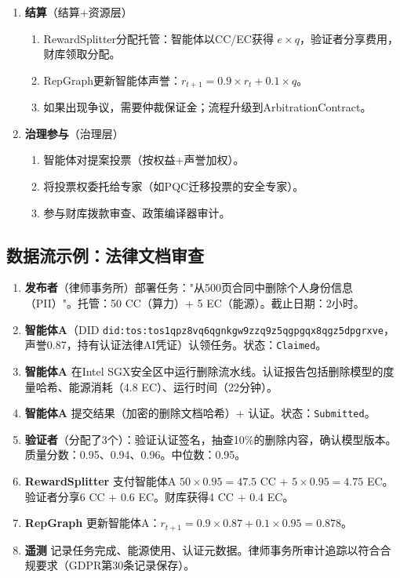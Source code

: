 \documentclass[11pt]{article}
\begin{document}
\begin{enumerate}
\begin{enumerate}[label=\alph*.]
    \end{enumerate}
  \item \textbf{结算}（结算+资源层）
    \begin{enumerate}[label=\alph*.]
      \item RewardSplitter分配托管：智能体以CC/EC获得 $e \times q$，验证者分享费用，财库领取分配。
      \item RepGraph更新智能体声誉：$r_{t+1} = 0.9 \times r_t + 0.1 \times q$。
      \item 如果出现争议，需要仲裁保证金；流程升级到ArbitrationContract。
    \end{enumerate}
  \item \textbf{治理参与}（治理层）
    \begin{enumerate}[label=\alph*.]
      \item 智能体对提案投票（按权益+声誉加权）。
      \item 将投票权委托给专家（如PQC迁移投票的安全专家）。
      \item 参与财库拨款审查、政策编译器审计。
    \end{enumerate}
\end{enumerate}

\subsection{数据流示例：法律文档审查}
\begin{enumerate}[label=\arabic*.]
  \item \textbf{发布者}（律师事务所）部署任务："从500页合同中删除个人身份信息（PII）"。托管：50 CC（算力）+ 5 EC（能源）。截止日期：2小时。
  \item \textbf{智能体A}（DID \texttt{did:tos:tos1qpz8vq6qgnkgw9zzq9z5qgpgqx8qgz5dpgrxve}，声誉0.87，持有认证法律AI凭证）认领任务。状态：\texttt{Claimed}。
  \item \textbf{智能体A} 在Intel SGX安全区中运行删除流水线。认证报告包括删除模型的度量哈希、能源消耗（4.8 EC）、运行时间（22分钟）。
  \item \textbf{智能体A} 提交结果（加密的删除文档哈希）+ 认证。状态：\texttt{Submitted}。
  \item \textbf{验证者}（分配了3个）：验证认证签名，抽查10\%的删除内容，确认模型版本。质量分数：0.95、0.94、0.96。中位数：0.95。
  \item \textbf{RewardSplitter} 支付智能体A $50 \times 0.95 = 47.5$ CC + $5 \times 0.95 = 4.75$ EC。验证者分享6 CC + 0.6 EC。财库获得4 CC + 0.4 EC。
  \item \textbf{RepGraph} 更新智能体A：$r_{t+1} = 0.9 \times 0.87 + 0.1 \times 0.95 = 0.878$。
  \item \textbf{遥测} 记录任务完成、能源使用、认证元数据。律师事务所审计追踪以符合合规要求（GDPR第30条记录保存）。
\end{enumerate}
\end{document}

